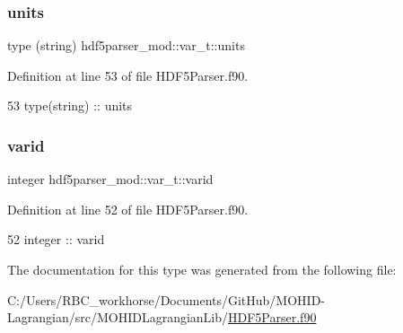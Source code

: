 \subsubsection{\texorpdfstring{units}{units}}
{\footnotesize\ttfamily type (string) hdf5parser\+\_\+mod\+::var\+\_\+t\+::units\hspace{0.3cm}{\ttfamily [private]}}



Definition at line 53 of file H\+D\+F5\+Parser.\+f90.


\begin{DoxyCode}
53         type(string) :: units
\end{DoxyCode}
\mbox{\label{structhdf5parser__mod_1_1var__t_a083c7d53fa470d9497a4f8217737dc07}} 
\subsubsection{\texorpdfstring{varid}{varid}}
{\footnotesize\ttfamily integer hdf5parser\+\_\+mod\+::var\+\_\+t\+::varid\hspace{0.3cm}{\ttfamily [private]}}



Definition at line 52 of file H\+D\+F5\+Parser.\+f90.


\begin{DoxyCode}
52         \textcolor{keywordtype}{integer} :: varid
\end{DoxyCode}


The documentation for this type was generated from the following file\+:\begin{DoxyCompactItemize}
\item 
C\+:/\+Users/\+R\+B\+C\+\_\+workhorse/\+Documents/\+Git\+Hub/\+M\+O\+H\+I\+D-\/\+Lagrangian/src/\+M\+O\+H\+I\+D\+Lagrangian\+Lib/\mbox{\hyperlink{_h_d_f5_parser_8f90}{H\+D\+F5\+Parser.\+f90}}\end{DoxyCompactItemize}
